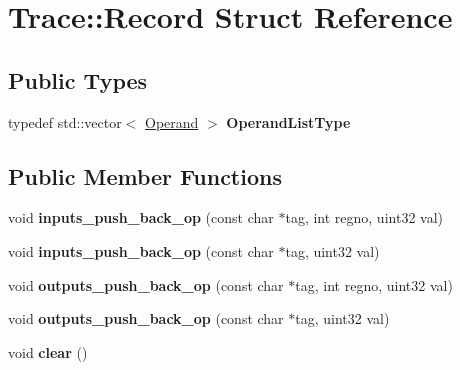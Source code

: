 \hypertarget{structTrace_1_1Record}{
\section{Trace::Record Struct Reference}
\label{structTrace_1_1Record}
}
\subsection*{Public Types}
\begin{DoxyCompactItemize}
\item 
\hypertarget{structTrace_1_1Record_a180a49f2bfb22355b363e219c964841c}{
typedef std::vector$<$ \hyperlink{structTrace_1_1Operand}{Operand} $>$ {\bfseries OperandListType}}
\label{structTrace_1_1Record_a180a49f2bfb22355b363e219c964841c}

\end{DoxyCompactItemize}
\subsection*{Public Member Functions}
\begin{DoxyCompactItemize}
\item 
\hypertarget{structTrace_1_1Record_ac8273cd7c6aca64757a6dfe5b37d7236}{
void {\bfseries inputs\_\-push\_\-back\_\-op} (const char $\ast$tag, int regno, uint32 val)}
\label{structTrace_1_1Record_ac8273cd7c6aca64757a6dfe5b37d7236}

\item 
\hypertarget{structTrace_1_1Record_a0d4f30b820a0523ab8829a268a0d04ad}{
void {\bfseries inputs\_\-push\_\-back\_\-op} (const char $\ast$tag, uint32 val)}
\label{structTrace_1_1Record_a0d4f30b820a0523ab8829a268a0d04ad}

\item 
\hypertarget{structTrace_1_1Record_a61484ad788baaa57462ebfb23637942d}{
void {\bfseries outputs\_\-push\_\-back\_\-op} (const char $\ast$tag, int regno, uint32 val)}
\label{structTrace_1_1Record_a61484ad788baaa57462ebfb23637942d}

\item 
\hypertarget{structTrace_1_1Record_ac1f177689ea6d50c3bd273b4f930b47f}{
void {\bfseries outputs\_\-push\_\-back\_\-op} (const char $\ast$tag, uint32 val)}
\label{structTrace_1_1Record_ac1f177689ea6d50c3bd273b4f930b47f}

\item 
\hypertarget{structTrace_1_1Record_a795423079fc1202660c2146bd662ebe0}{
void {\bfseries clear} ()}
\label{structTrace_1_1Record_a795423079fc1202660c2146bd662ebe0}

\end{DoxyCompactItemize}
